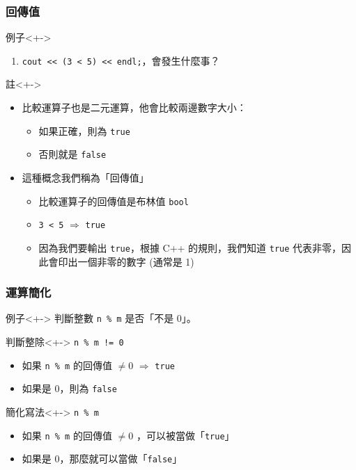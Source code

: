 \documentclass[utf8]{beamer}
\begin{document}
\begin{CJK}{UTF8}{bkai}
\begin{frame}[fragile]
  \frametitle{回傳值}
  \begin{block}{例子}<+->
    \begin{enumerate}
    \item \lstinline{cout << (3 < 5) << endl;}，會發生什麼事？
    \end{enumerate}
  \end{block}
  \begin{exampleblock}{註}<+->
    \begin{itemize}
    \item 比較運算子也是\alert{二元運算}，他會比較兩邊數字大小：
      \begin{itemize}[<+->]
      \item 如果正確，則為 \lstinline{true}
      \item 否則就是 \lstinline{false}
      \end{itemize}
    \item<+-> 這種概念我們稱為「\alert{回傳值}」
      \begin{itemize}[<+->]
      \item 比較運算子的回傳值是布林值 \lstinline{bool}
      \item \alert{\lstinline{3 < 5}} $\Rightarrow$ \lstinline{true}
      \item 因為我們要輸出 \lstinline{true}，根據 C++ 的規則，我們知道 \lstinline{true} 代表\alert{非零}，因此會印出一個非零的數字 (通常是 1)
      \end{itemize}
    \end{itemize}
  \end{exampleblock}
\end{frame}

\begin{frame}[fragile]
  \frametitle{運算簡化}
  \begin{block}{例子}<+->
  判斷整數 \lstinline{n % m} 是否「不是 0」。
  \end{block}
  \begin{exampleblock}{判斷整除}<+->
    \lstinline{n % m != 0}
    \begin{itemize}[<+->]
    \item 如果 \lstinline{n % m} 的回傳值 $\neq{0}$ $\Rightarrow$ \lstinline{true}
    \item 如果是 0，則為 \lstinline{false}
    \end{itemize}
  \end{exampleblock}
  \begin{alertblock}{簡化寫法}<+->
    \lstinline{n % m}
    \begin{itemize}[<+->]
    \item 如果 \lstinline{n % m} 的回傳值 $\neq{0}$ ，可以被當做「\lstinline{true}」
    \item 如果是 0，那麼就可以當做「\lstinline{false}」
    \end{itemize}
  \end{alertblock}
\end{frame}


\end{CJK}
\end{document}
